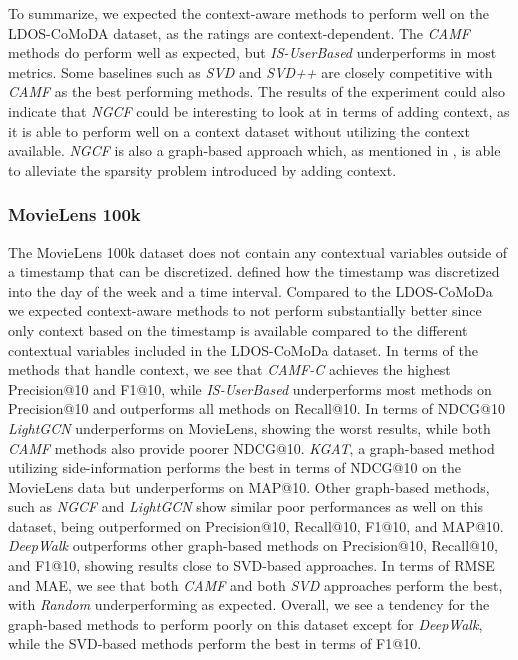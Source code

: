 To summarize, we expected the context-aware methods to perform well on the LDOS-CoMoDA dataset, as the ratings are context-dependent. 
The \textit{CAMF} methods do perform well as expected, but \textit{IS-UserBased} underperforms in most metrics.
Some baselines such as \textit{SVD} and \textit{SVD++} are closely competitive with \textit{CAMF} as the best performing methods.
The results of the experiment could also indicate that \textit{NGCF} could be interesting to look at in terms of adding context, as it is able to perform well on a context dataset without utilizing the context available. 
\textit{NGCF} is also a graph-based approach which, as mentioned in , is able to alleviate the sparsity problem introduced by adding context.

\subsubsection{MovieLens 100k}
The MovieLens 100k dataset does not contain any contextual variables outside of a timestamp that can be discretized.
 defined how the timestamp was discretized into the day of the week and a time interval.
Compared to the LDOS-CoMoDa we expected context-aware methods to not perform substantially better since only context based on the timestamp is available compared to the different contextual variables included in the LDOS-CoMoDa dataset. 
In terms of the methods that handle context, we see that \textit{CAMF-C} achieves the highest Precision@10 and F1@10, while \textit{IS-UserBased} underperforms most methods on Precision@10 and outperforms all methods on Recall@10.
In terms of NDCG@10 \textit{LightGCN} underperforms on MovieLens, showing the worst results, while both \textit{CAMF} methods also provide poorer NDCG@10.
\textit{KGAT}, a graph-based method utilizing side-information performs the best in terms of NDCG@10 on the MovieLens data but underperforms on MAP@10.
Other graph-based methods, such as \textit{NGCF} and \textit{LightGCN} show similar poor performances as well on this dataset, being outperformed on Precision@10, Recall@10, F1@10, and MAP@10.
\textit{DeepWalk} outperforms other graph-based methods on Precision@10, Recall@10, and F1@10, showing results close to SVD-based approaches.
In terms of RMSE and MAE, we see that both \textit{CAMF} and both \textit{SVD} approaches perform the best, with \textit{Random} underperforming as expected.
Overall, we see a tendency for the graph-based methods to perform poorly on this dataset except for \textit{DeepWalk}, while the SVD-based methods perform the best in terms of F1@10.

